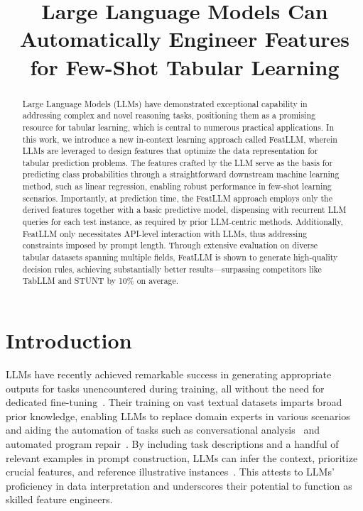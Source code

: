 \title{Large Language Models Can Automatically Engineer Features for Few-Shot Tabular Learning}

\begin{abstract}
Large Language Models (LLMs) have demonstrated exceptional capability in addressing complex and novel reasoning tasks, positioning them as a promising resource for tabular learning, which is central to numerous practical applications. In this work, we introduce a new in-context learning approach called \textsf{FeatLLM}, wherein LLMs are leveraged to design features that optimize the data representation for tabular prediction problems. The features crafted by the LLM serve as the basis for predicting class probabilities through a straightforward downstream machine learning method, such as linear regression, enabling robust performance in few-shot learning scenarios. Importantly, at prediction time, the \textsf{FeatLLM} approach employs only the derived features together with a basic predictive model, dispensing with recurrent LLM queries for each test instance, as required by prior LLM-centric methods. Additionally, \textsf{FeatLLM} only necessitates API-level interaction with LLMs, thus addressing constraints imposed by prompt length. Through extensive evaluation on diverse tabular datasets spanning multiple fields, \textsf{FeatLLM} is shown to generate high-quality decision rules, achieving substantially better results—surpassing competitors like TabLLM and STUNT by 10\% on average.
\end{abstract}

\section{Introduction}
LLMs have recently achieved remarkable success in generating appropriate outputs for tasks unencountered during training, all without the need for dedicated fine-tuning~\cite{creswell2022selection,imani2023mathprompter,taylor2022galactica}. Their training on vast textual datasets imparts broad prior knowledge, enabling LLMs to replace domain experts in various scenarios~\cite{Genomes2021,singhal2023large,wilcox2003role} and aiding the automation of tasks such as conversational analysis~\cite{finch2023leveraging} and automated program repair~\cite{fan2023automated}. By including task descriptions and a handful of relevant examples in prompt construction, LLMs can infer the context, prioritize crucial features, and reference illustrative instances~\cite{brown2020language,zhao2023survey}. This attests to LLMs’ proficiency in data interpretation and underscores their potential to function as skilled feature engineers.


